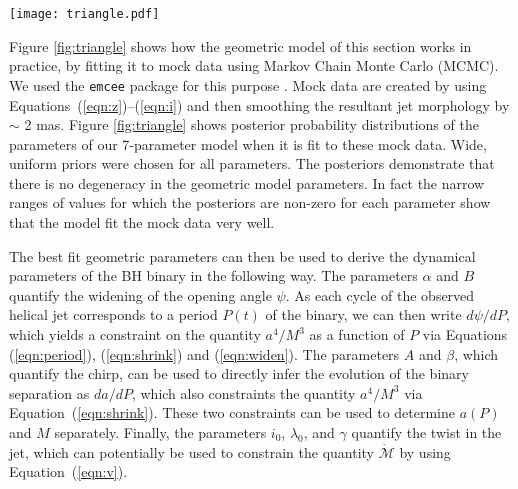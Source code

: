 \documentclass[a4paper,fleqn,usenatbib]{mnras}
\begin{document}
\begin{figure*}
\begin{center}
  \texttt{[image: triangle.pdf]}
\end{center}
\caption{One and two dimensional projections of posterior probability
  distributions of the 7-parameter geometric model described in
  Section~\ref{sec:geometric_model} to mock data.  Wide, uniform
  priors were chosen for all parameters.  The two-dimensional
  projections also show that there are no parameter degeneracies in
  the geometric model.  As described in the text, these parameter
  values can then be used to derive various physical parameters
  describing the black hole binary.}
\label{fig:triangle}
\end{figure*}

Figure \ref{fig:triangle} shows how the geometric model of this
section works in practice, by fitting it to mock data using Markov
Chain Monte Carlo (MCMC).  We used the \texttt{emcee} package for this
purpose \citep{2013PASP..125..306F}.  Mock data are created by using
Equations~(\ref{eqn:z})--(\ref{eqn:i}) and then smoothing the
resultant jet morphology by $\sim$ 2 mas.  Figure \ref{fig:triangle}
shows posterior probability distributions of the parameters of our
7-parameter model when it is fit to these mock data.  Wide, uniform
priors were chosen for all parameters.  The posteriors demonstrate
that there is no degeneracy in the geometric model parameters.  In
fact the narrow ranges of values for which the posteriors are non-zero
for each parameter show that the model fit the mock data very well.

The best fit geometric parameters can then be used to derive the
dynamical parameters of the BH binary in the following way.  The
parameters $\alpha$ and $B$ quantify the widening of the opening angle
$\psi$.  As each cycle of the observed helical jet corresponds to a
period $P(t)$ of the binary, we can then write $d\psi/dP$, which
yields a constraint on the quantity $a^4/M^3$ as a function of $P$ via
Equations (\ref{eqn:period}), (\ref{eqn:shrink}) and
(\ref{eqn:widen}).  The parameters $A$ and $\beta$, which quantify the
chirp, can be used to directly infer the evolution of the binary
separation as $da/dP$, which also constraints the quantity $a^4/M^3$
via Equation~(\ref{eqn:shrink}). These two constraints can be used to
determine $a(P)$ and $M$ separately.  Finally, the parameters
$i_0$, $\lambda_0$, and $\gamma$ quantify the twist in the jet,
which can potentially be used to constrain the quantity
$\dot{\mathcal{M}}$ by using Equation~(\ref{eqn:v}).
\end{document}

